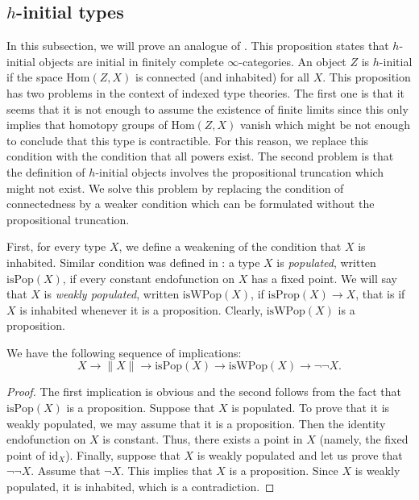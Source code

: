 \documentclass[reqno]{mscs}
\newcommand{\fs}[1]{\mathrm{#1}}
\newcommand{\Hom}{\fs{Hom}}
\newcommand{\id}{\fs{id}}
\numberwithin{figure}{section}
\begin{document}
\subsection{$h$-initial types}

In this subsection, we will prove an analogue of \cite[Proposition~2.2.2]{infty-gaft}.
This proposition states that $h$-initial objects are initial in finitely complete $\infty$-categories.
An object $Z$ is $h$-initial if the space $\Hom(Z,X)$ is connected (and inhabited) for all $X$.
This proposition has two problems in the context of indexed type theories.
The first one is that it seems that it is not enough to assume the existence of finite limits since this only implies that homotopy groups of $\Hom(Z,X)$ vanish which might be not enough to conclude that this type is contractible.
For this reason, we replace this condition with the condition that all powers exist.
The second problem is that the definition of $h$-initial objects involves the propositional truncation which might not exist.
We solve this problem by replacing the condition of connectedness by a weaker condition which can be formulated without the propositional truncation.

First, for every type $X$, we define a weakening of the condition that $X$ is inhabited.
Similar condition was defined in \cite[Definition~5]{gen-hedberg}: a type $X$ is \emph{populated}, written $\mathrm{isPop}(X)$, if every constant endofunction on $X$ has a fixed point.
We will say that $X$ is \emph{weakly populated}, written $\mathrm{isWPop}(X)$, if $\mathrm{isProp}(X) \to X$, that is if $X$ is inhabited whenever it is a proposition.
Clearly, $\mathrm{isWPop}(X)$ is a proposition.

\begin{prop}
We have the following sequence of implications:
\[ X \to \| X \| \to \mathrm{isPop}(X) \to \mathrm{isWPop}(X) \to \neg \neg X. \]
\end{prop}
\begin{proof}
The first implication is obvious and the second follows from the fact that $\mathrm{isPop}(X)$ is a proposition.
Suppose that $X$ is populated.
To prove that it is weakly populated, we may assume that it is a proposition.
Then the identity endofunction on $X$ is constant.
Thus, there exists a point in $X$ (namely, the fixed point of $\id_X$).
Finally, suppose that $X$ is weakly populated and let us prove that $\neg \neg X$.
Assume that $\neg X$.
This implies that $X$ is a proposition.
Since $X$ is weakly populated, it is inhabited, which is a contradiction.
\end{proof}
\end{document}
